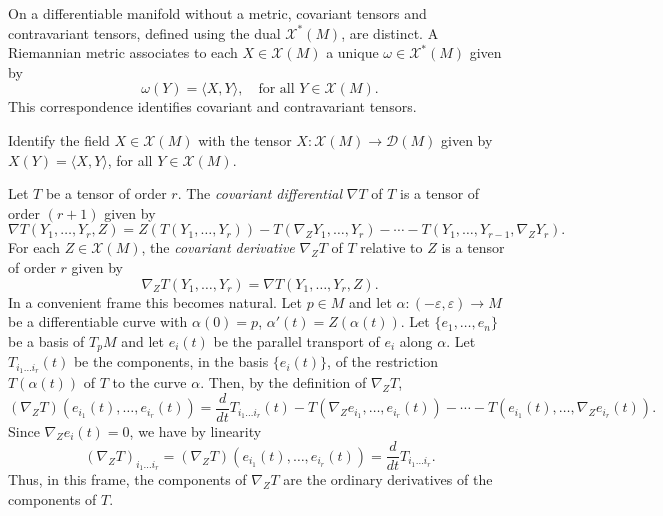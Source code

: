 \begin{remark}[Remark 5.5]
  \label{rem:dc-ch4-5-5}


  On a differentiable manifold without a metric, covariant tensors and
  contravariant tensors, defined using the dual $\mathcal{X}^*(M)$, are distinct.
  A Riemannian metric associates to each $X\in\mathcal{X}(M)$ a unique
  $\omega\in\mathcal{X}^*(M)$ given by
  $$
  \omega(Y)=\langle X,Y\rangle,\quad\text{for all }Y\in\mathcal{X}(M).
  $$
  This correspondence identifies covariant and contravariant tensors.
\end{remark}

\begin{remark}[Remark 5.6]
  \label{rem:dc-ch4-5-6}


  Identify the field $X\in\mathcal{X}(M)$ with the tensor
  $X:\mathcal{X}(M)\to\mathcal{D}(M)$ given by $X(Y)=\langle X,Y\rangle$,
  for all $Y\in\mathcal{X}(M)$.
\end{remark}

\begin{definition}
  \label{def:dc-ch4-5-7}


  Let $T$ be a tensor of order $r$. The \emph{covariant differential} $\nabla T$ of $T$
  is a tensor of order $(r+1)$ given by
  $$
  \nabla T(Y_1,\dots,Y_r,Z)=Z(T(Y_1,\dots,Y_r))-T(\nabla_Z Y_1,\dots,Y_r)-\cdots-T(Y_1,\dots,Y_{r-1},\nabla_Z Y_r).
  $$
  For each $Z\in\mathcal{X}(M)$, the \emph{covariant derivative} $\nabla_Z T$ of $T$
  relative to $Z$ is a tensor of order $r$ given by
  $$
  \nabla_Z T(Y_1,\dots,Y_r)=\nabla T(Y_1,\dots,Y_r,Z).
  $$
  In a convenient frame this becomes natural. Let $p\in M$ and let
  $\alpha:(-\varepsilon,\varepsilon)\to M$ be a differentiable curve with $\alpha(0)=p$,
  $\alpha'(t)=Z(\alpha(t))$. Let $\{e_1,\dots,e_n\}$ be a basis of $T_pM$ and let
  $e_i(t)$ be the parallel transport of $e_i$ along $\alpha$. Let $T_{i_1\dots i_r}(t)$
  be the components, in the basis $\{e_i(t)\}$, of the restriction $T(\alpha(t))$ of
  $T$ to the curve $\alpha$. Then, by the definition of $\nabla_Z T$,
  $$
  (\nabla_Z T)(e_{i_1}(t),\dots,e_{i_r}(t))=\frac{d}{dt}T_{i_1\dots i_r}(t)-T(\nabla_Z e_{i_1},\dots,e_{i_r}(t))-\cdots-T(e_{i_1}(t),\dots,\nabla_Z e_{i_r}(t)).
  $$
  Since $\nabla_Z e_i(t)=0$, we have by linearity
  $$
  (\nabla_Z T)_{i_1\dots i_r}=(\nabla_Z T)(e_{i_1}(t),\dots,e_{i_r}(t))=\frac{d}{dt}T_{i_1\dots i_r}.
  $$
  Thus, in this frame, the components of $\nabla_ZT$ are the ordinary derivatives
  of the components of $T$.
\end{definition}

